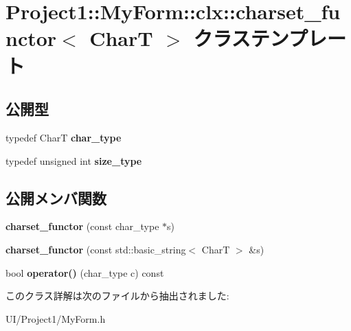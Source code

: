 \hypertarget{class_project1_1_1_my_form_1_1clx_1_1charset__functor}{}\section{Project1\+:\+:My\+Form\+:\+:clx\+:\+:charset\+\_\+functor$<$ CharT $>$ クラステンプレート}
\label{class_project1_1_1_my_form_1_1clx_1_1charset__functor}
\subsection*{公開型}
\begin{DoxyCompactItemize}
\item 
\mbox{\label{class_project1_1_1_my_form_1_1clx_1_1charset__functor_af46a677fedd21f2dd81e8e2f6d92871e}} 
typedef CharT {\bfseries char\+\_\+type}
\item 
\mbox{\label{class_project1_1_1_my_form_1_1clx_1_1charset__functor_a085c2a025adffe0c9585999580e36d4b}} 
typedef unsigned int {\bfseries size\+\_\+type}
\end{DoxyCompactItemize}
\subsection*{公開メンバ関数}
\begin{DoxyCompactItemize}
\item 
\mbox{\label{class_project1_1_1_my_form_1_1clx_1_1charset__functor_a3520f73cbbd9d52daa0d574804a346a9}} 
{\bfseries charset\+\_\+functor} (const char\+\_\+type $\ast$s)
\item 
\mbox{\label{class_project1_1_1_my_form_1_1clx_1_1charset__functor_a4e3d94cad00f37f1240e4b892503f5ad}} 
{\bfseries charset\+\_\+functor} (const std\+::basic\+\_\+string$<$ CharT $>$ \&s)
\item 
\mbox{\label{class_project1_1_1_my_form_1_1clx_1_1charset__functor_afa975ba6f5be1d62a25349ab63324dcb}} 
bool {\bfseries operator()} (char\+\_\+type c) const
\end{DoxyCompactItemize}


このクラス詳解は次のファイルから抽出されました\+:\begin{DoxyCompactItemize}
\item 
U\+I/\+Project1/My\+Form.\+h\end{DoxyCompactItemize}
